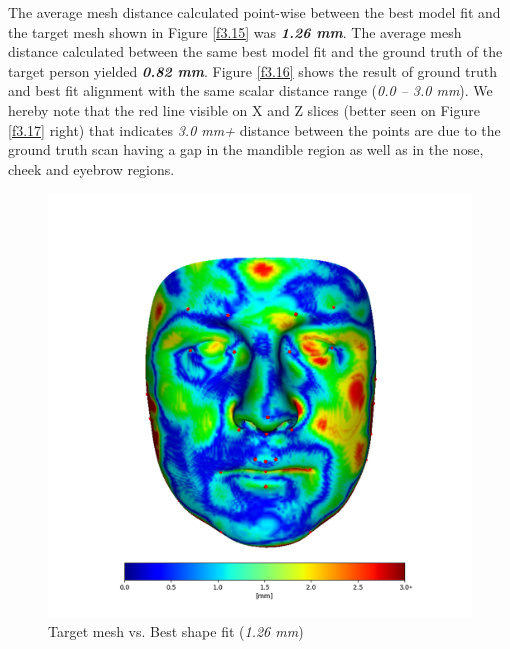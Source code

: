 The average mesh distance calculated point-wise between the best model fit and the target mesh shown in Figure \ref{f3.15} was \textbf{\textit{1.26 mm}}. The average mesh distance calculated between the same best model fit and the ground truth of the target person yielded \textbf{\textit{0.82 mm}}. Figure \ref{f3.16} shows the result of ground truth and best fit alignment with the same scalar distance range (\textit{0.0 – 3.0 mm}). We hereby note that the red line visible on X and Z slices (better seen on Figure \ref{f3.17} right) that indicates \textit{3.0 mm+} distance between the points are due to the ground truth scan having a gap in the mandible region as well as in the nose, cheek and eyebrow regions.

\begin{figure}
  \centering  
  \begin{minipage}{.49\textwidth}
    \centering
    \includegraphics[width=\textwidth]{Figures/Pictures/bf_big1_tnew1.png}
    \caption*{Target mesh vs. Best shape fit (\textit{1.26 mm})}
  \end{minipage}  
  \begin{minipage}{.49\textwidth}
    \centering

\end{minipage}
\end{figure}

